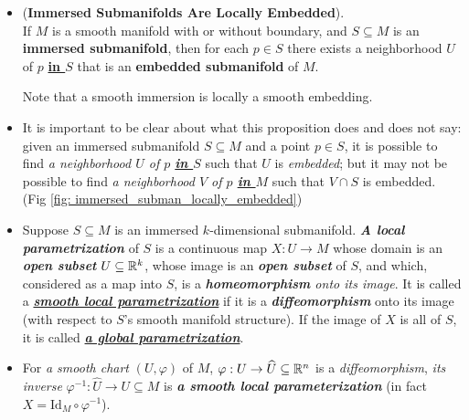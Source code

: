 \documentclass[11pt]{article}
\begin{document}
\begin{itemize}
\item \begin{proposition} (\textbf{Immersed Submanifolds Are Locally Embedded}). \citep{lee2003introduction} \\
If $M$ is a smooth manifold with or without boundary, and $S \subseteq M$ is an \textbf{immersed submanifold}, then for each $p \in S$ there exists a neighborhood $U$ of $p$ \underline{\textbf{in $S$}} that is an \textbf{embedded submanifold} of $M$.
\end{proposition} Note that a smooth immersion is locally a smooth embedding.

\item \begin{remark}
It is important to be clear about what this proposition does and does not say: given an immersed submanifold $S \subseteq M$ and a point $p \in S$,  it is possible to find \emph{a neighborhood $U$ of $p$ \underline{\textbf{in $S$}}} such that \underline{$U$} is \emph{embedded}; but it may not be possible to find \emph{a neighborhood $V$ of $p$ \underline{\textbf{in $M$}}} such that \underline{$V \cap S$} is embedded. (Fig \ref{fig: immersed_subman_locally_embedded})
\end{remark}

\item \begin{definition}
Suppose $S \subseteq M$ is an immersed $k$-dimensional submanifold. \emph{\textbf{A local parametrization}} of $S$ is a continuous map $X: U \rightarrow M$ whose domain is an \emph{\textbf{open subset}} $U \subseteq {\mathbb R}^k$, whose image is an \emph{\textbf{open subset}} of $S$, and which, considered as a map into $S$, is a \emph{\textbf{homeomorphism} onto its image}. It is called a \underline{\emph{\textbf{smooth local parametrization}}} if it is a \emph{\textbf{diffeomorphism}} onto its image (with respect to $S$’s smooth manifold structure). If the image of $X$ is all of $S$, it is called \underline{\emph{\textbf{a global parametrization}}}.
\end{definition}

\item \begin{remark}
For \emph{a smooth chart} $(U, \varphi)$ of $M$, $\varphi: U \rightarrow \widehat{U} \subseteq {\mathbb R}^{n}$ is a \emph{diffeomorphism}, \emph{its inverse} $\varphi^{-1}: \widehat{U} \rightarrow U \subseteq M$ is \emph{\textbf{a smooth local parameterization}} (in fact $X= \text{Id}_{M} \circ \varphi^{-1}$).
\end{remark}


\end{itemize}
\end{document}

